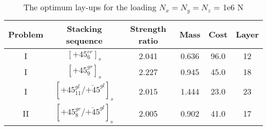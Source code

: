 \begin{table*}[!htb]
	\caption{The optimum lay-ups for the loading $N_x=N_y=N_z$ = 1e6 N} 
	\centering
	\begin{adjustbox}{width=1\textwidth}
	\begin{tabular}{cccccc}
	\toprule
	       Problem  &    Stacking sequence                                    & Strength ratio  & Mass  &  Cost   & Layer    \\ 
	\midrule																								  
	      I  &   $[\text{+}45_{6}^{cr}]_s$                            & 2.041           & 0.636 &  96.0  & 12  \\
		  I  &   $[\text{+}45_{9}^{gr}]_s$                            & 2.227           & 0.945 &  45.0  & 18  \\
		  I  &   $[\text{+}45_{11}^{gl}/\bar{\text{+}45}^{gl}]_s$                           & 2.015           & 1.444 &  23.0  & 23  \\
		  II &   $[\text{+}45_8^{gr}/\bar{\text{+}45}^{gl}]_s$          & 2.005           & 0.902 &  41.0  & 17 \\
	\bottomrule
\end{tabular}
\label{tab:NxNyNz}
	\end{adjustbox}
\end{table*}
